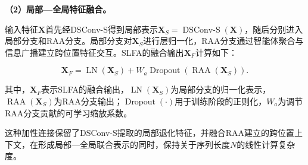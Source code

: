 \textbf{（2）局部—全局特征融合。}

输入特征$\mathbf X$首先经DSConv-S得到局部表示$\mathbf X_S=\operatorname{DSConv\text{-}S}(\mathbf X)$，随后分别进入局部分支和RAA分支。局部分支对$\mathbf X_S$进行层归一化，RAA分支通过智能体聚合与信息广播建立跨位置特征交互。SLFA的融合输出$\mathbf X_F$计算如下：

\begin{equation}
\mathbf X_F
=
\operatorname{LN}(\mathbf X_S)
+
W_a
\operatorname{Dropout}
\left(
\operatorname{RAA}(\mathbf X_S)
\right).
\label{eq:slfa_fusion}
\end{equation}

其中，$\mathbf X_F$表示SLFA的融合输出，$\operatorname{LN}(\mathbf X_S)$为局部分支的归一化表示，$\operatorname{RAA}(\mathbf X_S)$为RAA分支输出；$\operatorname{Dropout}(\cdot)$用于训练阶段的正则化\cite{ref75}，$W_a$为调节RAA分支贡献的可学习缩放系数。

这种加性连接保留了DSConv-S提取的局部退化特征，并融合RAA建立的跨位置上下文，在形成局部—全局联合表示的同时，保持关于序列长度$N$的线性计算复杂度。


